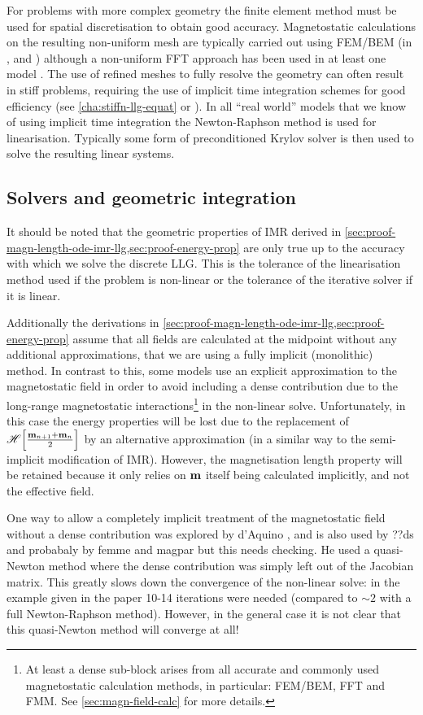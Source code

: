 For problems with more complex geometry the finite element method must be used for spatial discretisation to obtain good accuracy.
Magnetostatic calculations on the resulting non-uniform mesh are typically carried out using FEM/BEM (\eg in \nmag \cite{Fischbacher2007}, \magpar \cite{Scholz2003} and \femme) although a non-uniform FFT approach has been used in at least one model \cite{Chang2011}.
The use of refined meshes to fully resolve the geometry can often result in stiff problems, requiring the use of implicit time integration schemes for good efficiency (see \cref{cha:stiffn-llg-equat} or \cite{Shepherd2014}).
In all ``real world'' models that we know of using implicit time integration the Newton-Raphson method is used for linearisation.
Typically some form of preconditioned Krylov solver is then used to solve the resulting linear systems.


\subsection{Solvers and geometric integration}

It should be noted that the geometric properties of IMR derived in \cref{sec:proof-magn-length-ode-imr-llg,sec:proof-energy-prop} are only true up to the accuracy with which we solve the discrete LLG.
This is the tolerance of the linearisation method used if the problem is non-linear or the tolerance of the iterative solver if it is linear.

Additionally the derivations in \cref{sec:proof-magn-length-ode-imr-llg,sec:proof-energy-prop} assume that all fields are calculated at the midpoint without any additional approximations, \ie that we are using a fully implicit (monolithic) method.
In contrast to this, some models use an explicit approximation to the magnetostatic field in order to avoid including a dense contribution due to the long-range magnetostatic interactions\footnote{At least a dense sub-block arises from all accurate and commonly used magnetostatic calculation methods, in particular: FEM/BEM, FFT and FMM. See \cref{sec:magn-field-calc} for more details.} in the non-linear solve.
Unfortunately, in this case the energy properties will be lost due to the replacement of $\mathscr{H} {\left[ \frac{\boldsymbol{\mathrm{m}}_{n+1} + \boldsymbol{\mathrm{m}}_n}{2} \right]}$ by an alternative approximation (in a similar way to the semi-implicit modification of IMR).
However, the magnetisation length property will be retained because it only relies on $\boldsymbol{\mathrm{m}}$ itself being calculated implicitly, and not the effective field.

One way to allow a completely implicit treatment of the magnetostatic field without a dense contribution was explored by d'Aquino \cite{DAquino2005}, and is also used by \nmag \cite{??ds private communication? nmag paper?} ??ds and probabaly by femme and magpar but this needs checking.
He used a quasi-Newton method where the dense contribution was simply left out of the Jacobian matrix.
This greatly slows down the convergence of the non-linear solve: in the example given in the paper 10-14 iterations were needed (compared to $\sim2$ with a full Newton-Raphson method).
However, in the general case it is not clear that this quasi-Newton method will converge at all!

